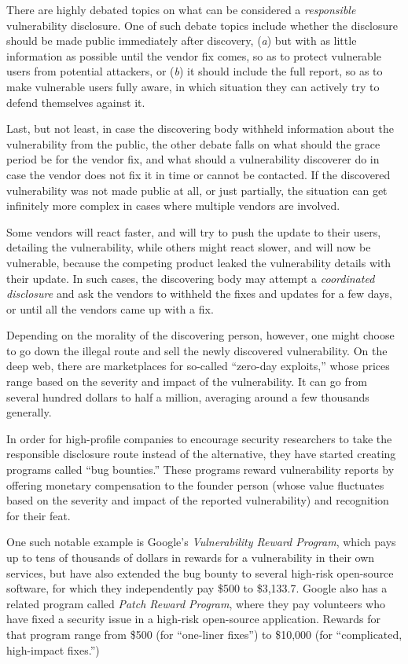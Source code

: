 \documentclass[a4paper,12pt]{article}
\begin{document}
	There are highly debated topics on what can be considered a \textit{responsible} vulnerability disclosure. One of such debate topics include whether the disclosure should be made public immediately after discovery, (\textit{a}) but with as little information as possible until the vendor fix comes, so as to protect vulnerable users from potential attackers, or (\textit{b}) it should include the full report, so as to make vulnerable users fully aware, in which situation they can actively try to defend themselves against it. 
	
	Last, but not least, in case the discovering body withheld information about the vulnerability from the public, the other debate falls on what should the grace period be for the vendor fix, and what should a vulnerability discoverer do in case the vendor does not fix it in time or cannot be contacted. If the discovered vulnerability was not made public at all, or just partially, the situation can get infinitely more complex in cases where multiple vendors are involved.
	
	Some vendors will react faster, and will try to push the update to their users, detailing the vulnerability, while others might react slower, and will now be vulnerable, because the competing product leaked the vulnerability details with their update. In such cases, the discovering body may attempt a \textit{coordinated disclosure} and ask the vendors to withheld the fixes and updates for a few days, or until all the vendors came up with a fix.
	
	Depending on the morality of the discovering person, however, one might choose to go down the illegal route and sell the newly discovered vulnerability. On the deep web, there are marketplaces for so-called ``zero-day exploits,'' whose prices range based on the severity and impact of the vulnerability. It can go from several hundred dollars to half a million, averaging around a few thousands generally\cite{nperlroth13}.
	
	In order for high-profile companies to encourage security researchers to take the responsible disclosure route instead of the alternative, they have started creating programs called ``bug bounties.'' These programs reward vulnerability reports by offering monetary compensation to the founder person (whose value fluctuates based on the severity and impact of the reported vulnerability) and recognition for their feat.
	
	One such notable example is Google's \textit{Vulnerability Reward Program}\cite{googlevrp15}, which pays up to tens of thousands of dollars in rewards for a vulnerability in their own services, but have also extended the bug bounty to several high-risk open-source software, for which they independently pay \$500 to \$3,133.7. Google also has a related program called \textit{Patch Reward Program}, where they pay volunteers who have fixed a security issue in a high-risk open-source application. Rewards for that program range from \$500 (for ``one-liner fixes'') to \$10,000 (for ``complicated, high-impact fixes.'')
	
\end{document}
